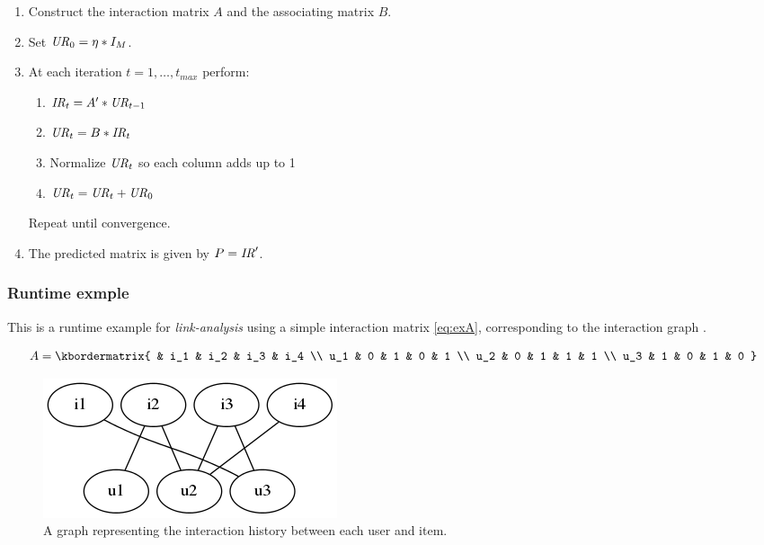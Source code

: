 \begin{enumerate}
    \item Construct the interaction matrix $A$ and the associating matrix $B$.

    \item Set $\mathit{UR}_0 = \eta * I_M$.
    \item At each iteration $t = 1, \ldots, t_{max}$ perform:

        \begin{enumerate}
            \item $\mathit{IR}_t = A' * \mathit{UR}_{t- 1}$
            \item $\mathit{UR}_t = B * \mathit{IR}_t$
            \item Normalize $\mathit{UR}_t$ so each column adds up to 1
            \item $\mathit{UR}_t = \mathit{UR}_t + \mathit{UR}_0$
        \end{enumerate}

        Repeat until convergence.

    \item The predicted matrix is given by $P = \mathit{IR}'$.

\end{enumerate}


\subsubsection{Runtime exmple}

This is a runtime example for \textit{link-analysis} using a simple interaction matrix \eqref{eq:exA}, corresponding to the interaction graph .

\begin{equation}\label{eq:exA}
  A = \kbordermatrix{
    &    i_1 & i_2 & i_3 & i_4 \\
    u_1 & 0   & 1   & 0   & 1  \\
    u_2 & 0   & 1   & 1   & 1  \\
    u_3 & 1   & 0   & 1   & 0
  }
\end{equation}

\begin{figure}[h!]
    \centering
    \includegraphics[width=0.3\linewidth]{fig/example_run/item_user_graph.png}
    \caption{A graph representing the interaction history between each user and item.}
    \label{fig:ex_graph}
\end{figure}

